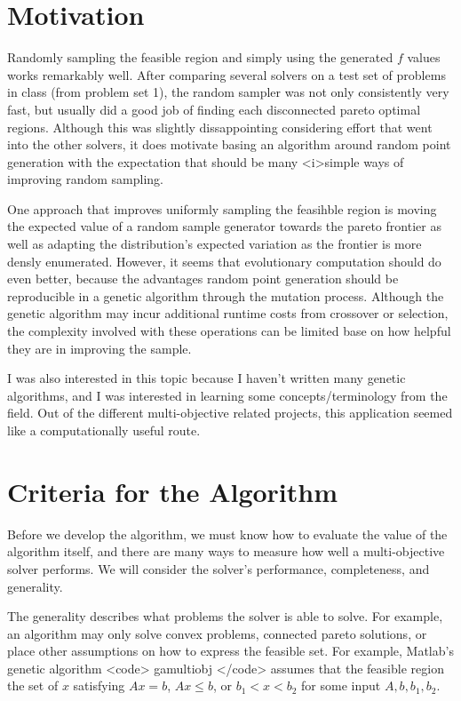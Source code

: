 \documentclass{article}
\begin{document}
\section{Motivation}

Randomly sampling the feasible region and simply using the generated $f$ values works remarkably well.
After comparing several solvers on a test set of problems in class (from problem set 1),
the random sampler was not only consistently very fast, but usually did a good job of finding each disconnected pareto optimal regions.
Although this was slightly dissappointing considering effort that went into the other solvers, it does motivate basing an algorithm around random point generation with
the expectation that should be many <i>simple ways of improving random sampling.

One approach that improves uniformly sampling the feasihble region is moving the expected value of a random sample generator towards the pareto frontier as well as adapting the
distribution's expected variation as the frontier is more densly enumerated.
However, it seems that evolutionary computation should do even better, because the advantages random point generation should be reproducible in a genetic algorithm through the mutation process.
Although the genetic algorithm may incur additional runtime costs from crossover or selection, the complexity involved with these operations can be limited
base on how helpful they are in improving the sample.

I was also interested in this topic because I haven't written many genetic algorithms, and I was interested in learning some concepts/terminology from the field.
Out of the different multi-objective related projects, this application seemed like a computationally useful route.

\section{Criteria for the Algorithm}

Before we develop the algorithm, we must know how to evaluate the value of the algorithm itself, and
there are many ways to measure how well a multi-objective solver performs.
We will consider the solver's performance, completeness, and generality.

The generality describes what problems the solver is able to solve.
For example, an algorithm may only solve convex problems, connected pareto solutions, or place other assumptions on how to express the feasible set.
For example, Matlab's genetic algorithm <code> gamultiobj </code> assumes that the feasible region the set of $x$ satisfying $Ax = b$, $Ax \le b$, or $b_1 < x < b_2$ for some input $A, b, b_1, b_2$.
\end{document}
